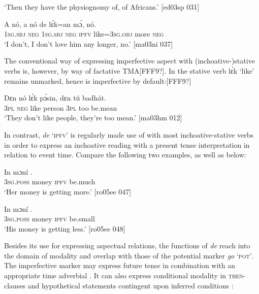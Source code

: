 \glt ‘Then they have the physiognomy of, of Africans.’ [ed03sp 031]
\z


\ea%
    \label{ex:key:334}
    \gll A    nó,  a    nó  de  lɛ́k=an    mɔ́,    nó.\\
\textsc{1sg.sbj}  \textsc{neg}  \textsc{1sg.sbj}  \textsc{neg}  \textsc{ipfv}  like=\textsc{3sg.obj}  more  \textsc{neg}\\

\glt ‘I don’t, I don’t love him any longer, no.’ [ma03ni 037]
\z

The conventional way of expressing imperfective aspect with (inchoative-)stative verbs is, however, by way of factative TMA[FFF9?]. In  the stative verb lɛ́k ‘like’ remains unmarked, hence is imperfective by default:[FFF9?] 


\ea%
    \label{ex:key:335}
    \gll Dɛn    nó  lɛ́k  pɔ́sin,  dɛn  tú  badhát.\\
\textsc{3pl}    \textsc{neg}  like  person  \textsc{3pl}  too  be.mean\\

\glt ‘They don’t like people, they’re too mean.’ [ma03hm 012]
\z

In contrast, \textit{de} ‘\textsc{ipfv}’ is regularly made use of with most inchoative-stative verbs in order to express an inchoative reading with a present tense interpretation in relation to event time. Compare the following two examples, as well as  below: 


\ea%
    \label{ex:key:336}
    \gll In    mɔní   .\\
\textsc{3sg.poss}  money  \textsc{ipfv}  be.much\\

\glt ‘Her money is getting more.’ [ro05ee 047]
\z


\ea%
    \label{ex:key:337}
    \gll In    mɔní   .\\
\textsc{3sg.poss}  money  \textsc{ipfv}  be.small\\

\glt ‘His money is getting less.’ [ro05ee 048]
\z

Besides its use for expressing aspectual relations, the functions of \textit{de} reach into the domain of modality and overlap with those of the potential marker \textit{go} ‘\textsc{pot’}. The imperfective marker may express future tense in combination with an appropriate time adverbial . It can also express conditional modality in \textsc{then-}clauses and hypothetical statements contingent upon inferred conditions :


